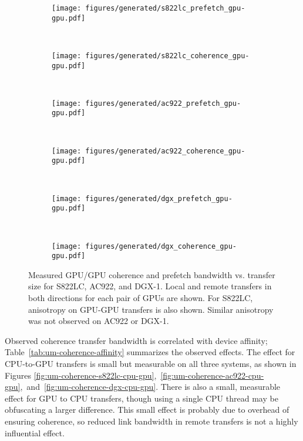 \begin{figure}[H]
	\centering
	\begin{subfigure}[b]{0.45\textwidth}
		\texttt{[image: figures/generated/s822lc\_prefetch\_gpu-gpu.pdf]}
		\caption{}
		\label{fig:um-prefetch-s822lc-gpu-gpu}
	\end{subfigure}
	~
	\begin{subfigure}[b]{0.45\textwidth}
		\texttt{[image: figures/generated/s822lc\_coherence\_gpu-gpu.pdf]}
		\caption{}
		\label{fig:um-coherence-s822lc-gpu-gpu}
	\end{subfigure}
	\\
	\begin{subfigure}[b]{0.45\textwidth}
		\texttt{[image: figures/generated/ac922\_prefetch\_gpu-gpu.pdf]}
		\caption{}
		\label{fig:um-prefetch-ac922-gpu-gpu}
	\end{subfigure}
	~
	\begin{subfigure}[b]{0.45\textwidth}
		\texttt{[image: figures/generated/ac922\_coherence\_gpu-gpu.pdf]}
		\caption{}
		\label{fig:um-coherence-ac922-gpu-gpu}
	\end{subfigure}
	\\
	\begin{subfigure}[b]{0.45\textwidth}
		\texttt{[image: figures/generated/dgx\_prefetch\_gpu-gpu.pdf]}
		\caption{}
		\label{fig:um-prefetch-dgx-gpu-gpu}
	\end{subfigure}
	~
	\begin{subfigure}[b]{0.45\textwidth}
		\texttt{[image: figures/generated/dgx\_coherence\_gpu-gpu.pdf]}
		\caption{}
		\label{fig:um-coherence-dgx-gpu-gpu}
	\end{subfigure}
	\caption[GPU/GPU Coherence and Prefetch Bandwidth]{
		Measured GPU/GPU coherence and prefetch bandwidth vs. transfer size for S822LC, AC922, and DGX-1.
		Local and remote transfers in both directions for each pair of GPUs are shown.
		For S822LC, anisotropy on GPU-GPU transfers is also shown.
		Similar anisotropy was not observed on AC922 or DGX-1.
	}
	\label{fig:um-gpu-gpu}
\end{figure}

Observed coherence transfer bandwidth is correlated with device affinity; Table~\ref{tab:um-coherence-affinity} summarizes the observed effects.
The effect for CPU-to-GPU transfers is small but measurable on all three systems, as shown in Figures \ref{fig:um-coherence-s822lc-cpu-gpu},~\ref{fig:um-coherence-ac922-cpu-gpu},~and~\ref{fig:um-coherence-dgx-cpu-gpu}.
There is also a small, measurable effect for GPU to CPU transfers, though using a single CPU thread may be obfuscating a larger difference.
This small effect is probably due to overhead of ensuring coherence, so reduced link bandwidth in remote transfers is not a highly influential effect.


